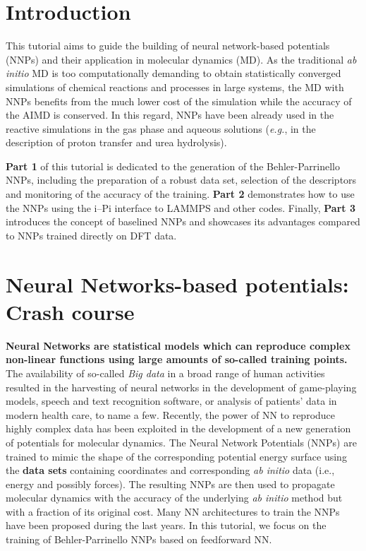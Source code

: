 \documentclass[12pt]{article}
\begin{document}

\newpage
\tableofcontents

\newpage
\pagestyle{fancy}
\renewcommand\headrulewidth{1pt}
\renewcommand\footrulewidth{1pt}
\fancyfoot[C]{\thepage}
\fancyfoot[R]{\today}
\section{Introduction}
This tutorial aims to guide the building of neural network-based potentials (NNPs) and their application in molecular dynamics (MD). As the traditional \textit{ab initio} MD is too computationally demanding to obtain statistically converged simulations of chemical reactions and processes in large systems, the MD with NNPs benefits from the much lower cost of the simulation while the accuracy of the AIMD is conserved.  
In this regard, NNPs have been already used in the reactive simulations in the gas phase and aqueous solutions (\textit{e.g.}, in the description of proton transfer and urea hydrolysis). 

\textbf{Part 1} of this tutorial is dedicated to the generation of the Behler-Parrinello NNPs, including the preparation of a robust data set, selection of the descriptors and monitoring of the accuracy of the training. \textbf{Part 2} demonstrates how to use the NNPs using the i--Pi interface to LAMMPS and other codes. Finally, \textbf{Part 3} introduces the concept of baselined NNPs and showcases its advantages compared to NNPs trained directly on DFT data. 



\section{Neural Networks-based potentials: Crash course}

\textbf{Neural Networks are statistical models which can reproduce complex non-linear functions using large amounts of so-called training points.} The availability of so-called \textit{Big data} in a broad range of human activities resulted in the harvesting of neural networks in the development of game-playing models, speech and text recognition software, or analysis of patients' data in modern health care, to name a few. Recently, the power of NN to reproduce highly complex data has been exploited in the development of a new generation of potentials for molecular dynamics. The Neural Network Potentials (NNPs) are trained to mimic the shape of the corresponding potential energy surface using the \textbf{data sets} containing coordinates and corresponding \textit{ab initio} data (i.e., energy and possibly forces). The resulting NNPs are then used to propagate molecular dynamics with the accuracy of the underlying \textit{ab initio} method but with a fraction of its original cost. Many NN architectures to train the NNPs have been proposed during the last years. In this tutorial, we focus on the training of Behler-Parrinello NNPs based on feedforward NN.  
\end{document}
